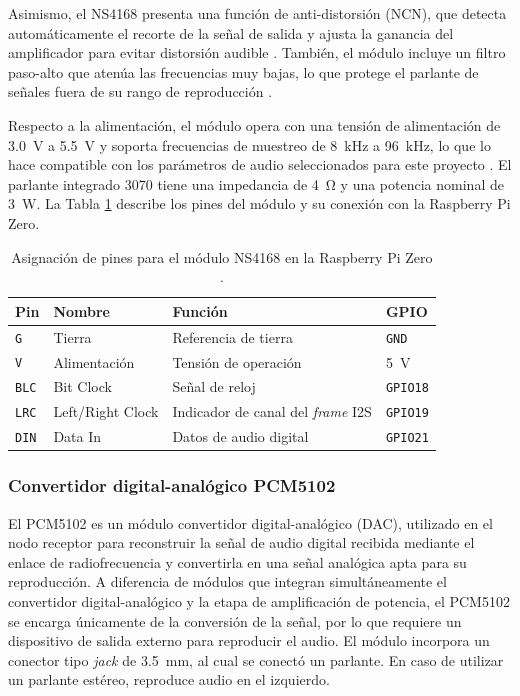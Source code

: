 Asimismo, el NS4168 presenta una función de anti-distorsión (NCN), que detecta automáticamente el recorte de la señal de salida y ajusta la ganancia del amplificador para evitar distorsión audible \cite{ns4168_datasheet}.
También, el módulo incluye un filtro paso-alto que atenúa las frecuencias muy bajas, lo que protege el parlante de señales fuera de su rango de reproducción \cite{ns4168_datasheet}.

Respecto a la alimentación, el módulo opera con una tensión de alimentación de \SI{3.0}{\volt} a \SI{5.5}{\volt} y soporta frecuencias de muestreo de \SI{8}{\kilo\hertz} a \SI{96}{\kilo\hertz}, lo que lo hace compatible con los parámetros de audio seleccionados para este proyecto \cite{ns4168_datasheet}.
El parlante integrado 3070 tiene una impedancia de \SI{4}{\ohm} y una potencia nominal de \SI{3}{\watt}.
La Tabla \ref{tab:ns4168_pines} describe los pines del módulo y su conexión con la Raspberry Pi Zero.

\begin{table}[htb]
    \centering
    \caption{Asignación de pines para el módulo NS4168 en la Raspberry Pi Zero \cite{ns4168_datasheet}.}
    \label{tab:ns4168_pines}
    \begin{tabular}{@{}llp{4.5cm}l@{}}
        \toprule
        Pin & Nombre & Función & GPIO \\
        \midrule
        \texttt{G}   & Tierra           & Referencia de tierra                      & \texttt{GND} \\
        \texttt{V}   & Alimentación     & Tensión de operación                      & \SI{5}{\volt} \\
        \texttt{BLC} & Bit Clock        & Señal de reloj                            & \texttt{GPIO18} \\
        \texttt{LRC} & Left/Right Clock & Indicador de canal del \textit{frame} I2S & \texttt{GPIO19} \\
        \texttt{DIN} & Data In          & Datos de audio digital                    & \texttt{GPIO21} \\
        \bottomrule
    \end{tabular}
\end{table}

\subsubsection{Convertidor digital-analógico PCM5102} \label{sss:pcm5102}

El PCM5102 es un módulo convertidor digital-analógico (DAC), utilizado en el nodo receptor para reconstruir la señal de audio digital recibida mediante el enlace de radiofrecuencia y convertirla en una señal analógica apta para su reproducción.
A diferencia de módulos que integran simultáneamente el convertidor digital-analógico y la etapa de amplificación de potencia, el PCM5102 se encarga únicamente de la conversión de la señal, por lo que requiere un dispositivo de salida externo para reproducir el audio.
El módulo incorpora un conector tipo \textit{jack} de \SI{3.5}{\milli\meter}, al cual se conectó un parlante.
En caso de utilizar un parlante estéreo, reproduce audio en el izquierdo.

